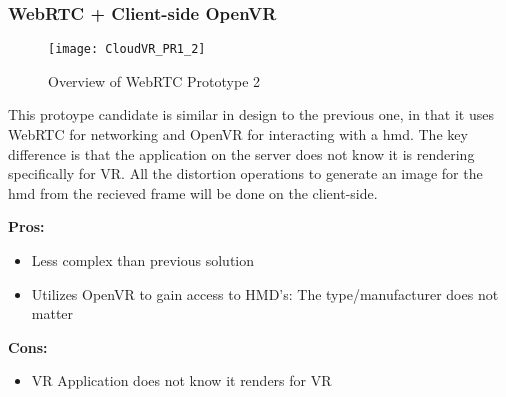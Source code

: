 \subsubsection{WebRTC + Client-side OpenVR}
\begin{figure}[h!]
\caption{Overview of WebRTC Prototype 2}
\label{fig:pr12}
\texttt{[image: CloudVR\_PR1\_2]}
\end{figure}

This protoype candidate is similar in design to the previous one, in that it uses WebRTC for networking and OpenVR for interacting with a \acrshort{hmd}. The key difference is that the application on the server does not know it is rendering specifically for VR. All the distortion operations to generate an image for the \acrshort{hmd} from the recieved frame will be done on the client-side.
\newline
\begin{varwidth}[t]{.5\textwidth}
\renewcommand\labelitemi{+}
\textbf{Pros:}
\begin{itemize}
\item Less complex than previous solution
\item Utilizes OpenVR to gain access to HMD's: The type/manufacturer does not matter
\end{itemize}
\end{varwidth}
\hspace{4em}
\begin{varwidth}[t]{.5\textwidth}
\renewcommand\labelitemi{-}
\textbf{Cons:}
\begin{itemize}
\item VR Application does not know it renders for VR
\end{itemize}
\end{varwidth}